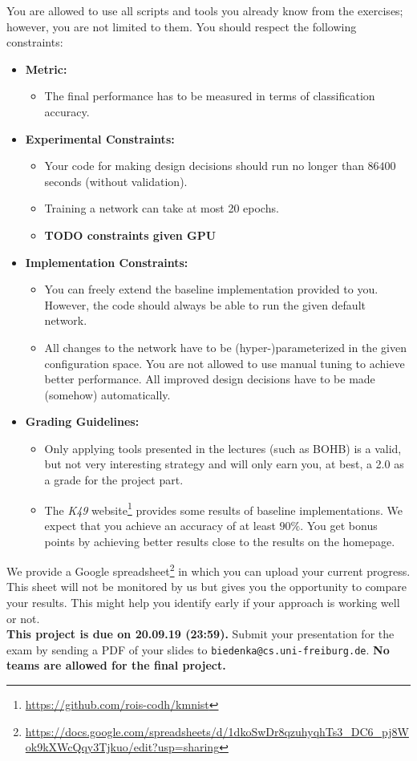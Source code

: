 \documentclass[10pt,a4paper]{article}
\newcommand{\duedate}{20.09.19 (23:59)}
\newcommand{\due}{{\bf This project is due on \duedate.} }
\begin{document}
		You are allowed to use all scripts and tools you already know from the exercises; however, you are not limited to them.
		\newpage\noindent
		You should respect the following constraints:
		\begin{itemize}
			\item \textbf{Metric:}
			\begin{itemize}
				\item The final performance has to be measured in terms of classification accuracy.\\
			\end{itemize}
			\item \textbf{Experimental Constraints:}
			\begin{itemize}
				\item Your code for making design decisions should run no longer than $86400$ seconds (without validation).
				\item Training a network can take at most 20 epochs.
				\item {\bf TODO constraints given GPU}
			\end{itemize}
			\item \textbf{Implementation Constraints:}
			\begin{itemize}
			  \item You can freely extend the baseline implementation provided to you. However, the code should always be able to run the given default network.
			  \item All changes to the network have to be (hyper-)parameterized in the given configuration space. You are not allowed to use manual tuning to achieve better performance. All improved design decisions have to be made (somehow) automatically.
			\end{itemize}
			\item \textbf{Grading Guidelines:}
			\begin{itemize}
			  \item Only applying tools presented in the lectures (such as BOHB) is a valid, but not very interesting strategy and will only earn you, at best, a 2.0 as a grade for the
			  project part.
			  \item The \textit{K49} website\footnote{\url{https://github.com/rois-codh/kmnist}} provides some results of baseline implementations. We expect that you achieve an accuracy of at least $90\%$. You get bonus points by achieving better results close to the results on the homepage.
			\end{itemize}
		\end{itemize}
		
		We provide a Google spreadsheet\footnote{\url{https://docs.google.com/spreadsheets/d/1dkoSwDr8qzuhyqhTs3_DC6_pj8Wok9kXWcQqy3Tjkuo/edit?usp=sharing}} in which you can upload your current progress. This sheet will not be monitored by us but gives you the opportunity to compare your results. This might help you identify early if your approach is working well or not.
\vspace*{\fill}\\
\noindent
\due Submit your presentation for the exam by sending a PDF of your slides to \texttt{biedenka@cs.uni-freiburg.de}. \textbf{No teams are allowed for the final project.}
\end{document}
